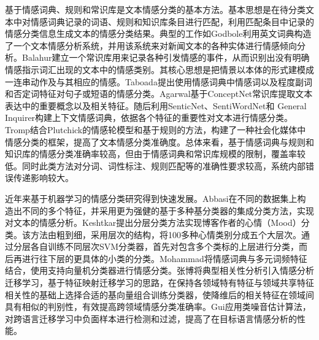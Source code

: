 基于情感词典、规则和常识库是文本情感分类的基本方法。基本思想是在待分类文本中对情感词典记录的词语、规则和知识库条目进行匹配，利用匹配条目中记录的情感分类信息生成文本的情感分类结果。典型的工作如Godbole利用英文词典构造了一个文本情感分析系统，并用该系统来对新闻文本的各种实体进行情感倾向分析。Balahur建立一个常识库用来记录各种引发情感的事件，从而识别出没有明确情感指示词汇出现的文本中的情感类别。其核心思想是把情景以本体的形式建模成一连串动作及与其相应的情感。Taboada提出使用情感词典中情感词以及程度副词和否定词特征对句子或短语的情感分类。Agarwal基于ConceptNet常识库提取文本表达中的重要概念以及相关特征。随后利用SenticNet、SentiWordNet和 General Inquirer构建上下文情感词典，依据各个特征的重要性对文本进行情感分类。Tromp结合Plutchick的情感轮模型和基于规则的方法，构建了一种社会化媒体中情感分类的框架，提高了文本情感分类准确度。总体来看，基于情感词典与规则和知识库的情感分类准确率较高，但由于情感词典和常识库规模的限制，覆盖率较低。同时此类方法对分词、词性标注、规则匹配等的准确性要求较高，系统内部错误传递影响较大。

近年来基于机器学习的情感分类研究得到快速发展。Abbasi在不同的数据集上构造出不同的多个特征，并采用更为强健的基于多种基分类器的集成分类方法，实现对文本的情感分析。Keshtkar提出分层分类方法实现博客作者的心情（Mood）分类。该方法由粗到细，采用层次的结构，将100多种心情类别分成五个大层次。通过分层各自训练不同层次SVM分类器，首先对包含多个类标的上层进行分类，而后再进行往下层的更具体的小类的分类。Mohammad将情感词典与多元词频特征结合，使用支持向量机分类器进行情感分类。张博将典型相关性分析引入情感分析迁移学习，基于特征映射迁移学习的思路，在保持各领域特有特征与领域共享特征相关性的基础上选择合适的基向量组合训练分类器，使降维后的相关特征在领域间具有相似的判别性，有效提高跨领域情感分类准确率。Gui应用类噪音估计算法，对跨语言迁移学习中负面样本进行检测和过滤，提高了在目标语言情感分析的性能。

